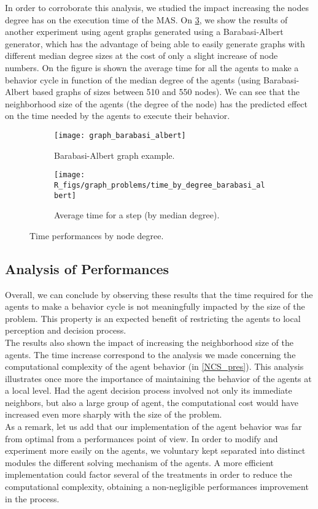 In order to corroborate this analysis, we studied the impact increasing the nodes degree has on the execution time of the MAS. On \figurename{} \ref{experiment_degrees}, we show the results of another experiment using agent graphs generated using a Barabasi-Albert generator, which has the advantage of being able to easily generate graphs with different median degree sizes at the cost of only a slight increase of node numbers. On the figure is shown the average time for all the agents to make a behavior cycle in function of the median degree of the agents (using Barabasi-Albert based graphs of sizes between 510 and 550 nodes). We can see that the neighborhood size of the agents (the degree of the node) has the predicted effect on the time needed by the agents to execute their behavior.

\begin{figure}
\centering
	\begin{subfigure}[b]{0.45\textwidth}
		\texttt{[image: graph\_barabasi\_albert]}
		\caption{Barabasi-Albert graph example.}\label{experiment_degrees:graph}
	\end{subfigure}
	\begin{subfigure}[b]{0.45\textwidth}
			\texttt{[image: R\_figs/graph\_problems/time\_by\_degree\_barabasi\_albert]}
		\caption{Average time for a step (by median degree).}\label{experiment_degrees:res}
	\end{subfigure}
\caption{Time performances by node degree.}
\label{experiment_degrees}
\end{figure}

\subsection{Analysis of Performances}

Overall, we can conclude by observing these results that the time required for the agents to make a behavior cycle is not meaningfully impacted by the size of the problem. This property is an expected benefit of restricting the agents to local perception and decision process.\\
The results also shown the impact of increasing the neighborhood size of the agents. The time increase correspond to the analysis we made concerning the computational complexity of the agent behavior (in \ref{NCS_pres}). This analysis illustrates once more the importance of maintaining the behavior of the agents at a local level. Had the agent decision process involved not only its immediate neighbors, but also a large group of agent, the computational cost would have increased even more sharply with the size of the problem.\\
As a remark, let us add that our implementation of the agent behavior was far from optimal from a performances point of view. In order to modify and experiment more easily on the agents, we voluntary kept separated into distinct modules the different solving mechanism of the agents. A more efficient implementation could factor several of the treatments in order to reduce the computational complexity, obtaining a non-negligible performances improvement in the process.

